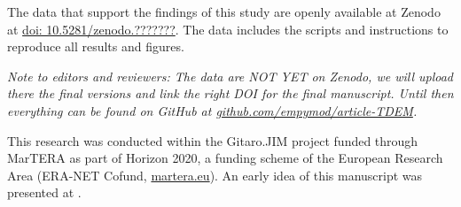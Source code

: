\documentclass[extra, camera,%
    referee,     %
]{gji}
\begin{document}
The data that support the findings of this study are openly available at Zenodo
at \href{https://zenodo.org/badge/DOI/10.5281/zenodo.???????}{doi:
10.5281/zenodo.???????}. The data includes the scripts and instructions to
reproduce all results and figures.

\emph{Note to editors and reviewers: The data are NOT YET on Zenodo, we will
  upload there the final versions and link the right DOI for the final
  manuscript. Until then everything can be found on GitHub at
  \href{https://github.com/empymod/article-TDEM}%
  {github.com/empymod/article-TDEM}.}


\begin{acknowledgments} %
This research was conducted within the Gitaro.JIM project funded through
MarTERA as part of Horizon 2020, a funding scheme of the European Research Area
(ERA-NET Cofund, \href{https://www.martera.eu}{martera.eu}).
An early idea of this manuscript was presented at \cite{EAGE.20.Werthmuller}.
\end{acknowledgments}





\label{lastpage}
\end{document}
